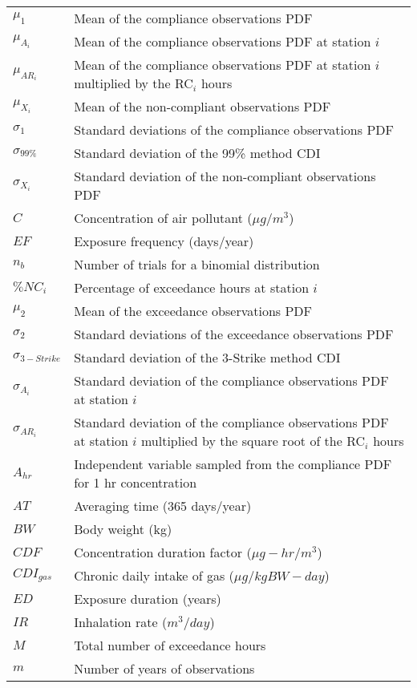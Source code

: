 \begin{longtable}{ll}
$\mu_{1}$ & Mean of the compliance observations PDF \\
$\mu_{A_{i}}$ & Mean of the compliance observations PDF at station $i$ \\
$\mu_{AR_{i}}$ & Mean of the compliance observations PDF at station $i$ multiplied by the RC$_{i}$ hours \\
$\mu_{X_{i}}$ & Mean of the non-compliant observations PDF \\
$\sigma_{1}$ & Standard deviations of the compliance observations PDF \\
$\sigma_{99\%}$ & Standard deviation of the 99\% method CDI \\
$\sigma_{X_{i}}$ & Standard deviation of the non-compliant observations PDF \\
$C$ & Concentration of air pollutant ($\mu g/m^{3}$) \\
$EF$ & Exposure frequency (days/year)\\
$n_{b}$ & Number of trials for a binomial distribution \\
$\%NC_{i}$ & Percentage of exceedance hours at station $i$ \\
$\mu_{2}$ & Mean of the exceedance observations PDF \\
$\sigma_{2}$ & Standard deviations of the exceedance observations PDF \\
$\sigma_{3-Strike}$ & Standard deviation of the 3-Strike method CDI \\
$\sigma_{A_{i}}$ & Standard deviation of the compliance observations PDF at station $i$ \\
$\sigma_{AR_{i}}$ & Standard deviation of the compliance observations PDF at station $i$ multiplied by the square root of the RC$_{i}$ hours \\
$A_{hr}$ & Independent variable sampled from the compliance PDF for 1 hr concentration \\
$AT$ & Averaging time (365 days/year) \\
$BW$ & Body weight (kg)\\
$CDF$ & Concentration duration factor ($\mu g-hr/m^{3}$)\\
$CDI_{gas}$ & Chronic daily intake of gas  ($\mu g/kgBW-day$)\\
$ED$ & Exposure duration (years)\\
$IR$ & Inhalation rate ($m^{3}/day$)\\
$M$ & Total number of exceedance hours \\
$m$ & Number of years of observations \\

\end{longtable}
